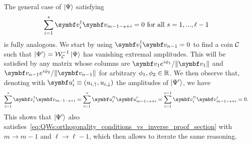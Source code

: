 The general case of $\ket\Psi$ satisfying
\begin{equation}
    \sum_{i=1}^s \bs v_i^\dagger \bs v_{m-1-s+i}=0
    \text{ for all }s=1,...,\ell-1
    \label{eq:QWs:orthogonality_conditions_vs_inverse_proof_section}
\end{equation}
is fully analogous. We start by using $\bs v_1^\dagger \bs v_{n-1}=0$ to find a coin ${\mathcal{C}}$ such that $\ket{\Psi'}={\mathcal{W}}_{{\mathcal{C}}}^{-1}\ket\Psi$ has vanishing extremal amplitudes.
This will be satisfied by any matrix whose columns are $\bs v_1 e^{i\phi_1}/\|\bs v_1\|$ and $\bs v_{n-1} e^{i\phi_2}/\|\bs v_{n-1}\|$ for arbitrary $\phi_1,\phi_2\in{\mathbb{R}}$.
We then observe that, denoting with $\bs u_i'\equiv(u_{i,\uparrow},u_{i,\downarrow})$ the amplitudes of $\ket{\Psi'}$, we have
\begin{equation}
    \sum_{i=1}^s \bs v_i^\dagger \bs v_{m-1-s+i}
    = \sum_{i=1}^s \bs u_i'^\dagger \bs u_{m-1-s+i}'
    = \sum_{i=1}^{s-1} \bs v_i'^\dagger \bs v_{m-1-s+i}' = 0.
\end{equation}
This shows that $\ket{\Psi'}$ also satisfies~\cref{eq:QWs:orthogonality_conditions_vs_inverse_proof_section} with $m\to m-1$ and $\ell\to\ell-1$, which then allows to iterate the same reasoning.

